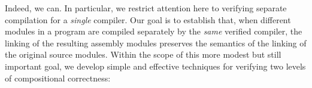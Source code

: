 Indeed, we can.  In particular, we restrict attention here to
verifying separate compilation for a \emph{single} compiler.  Our goal
is to establish that, when different modules in a program are compiled
separately by the \emph{same} verified compiler, the linking of the
resulting assembly modules preserves the semantics of the linking of
the original source modules.  Within the scope of this more modest but
still important goal, we develop simple and effective techniques for
verifying two levels of compositional correctness:
%
%
%
